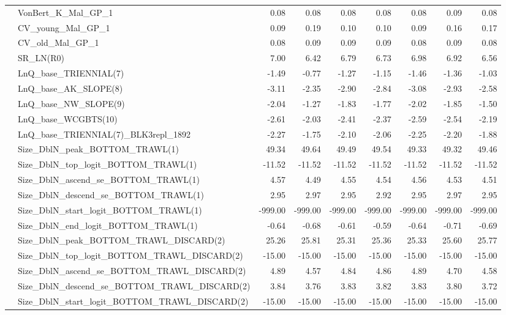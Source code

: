 \documentclass[
]{scrartcl}
\begin{document}
\begin{landscape}
\begin{longtable}{llrrrrrrr}
 & VonBert\_K\_Mal\_GP\_1 & 0.08 & 0.08 & 0.08 & 0.08 & 0.08 & 0.09 & 0.08 \\ 
 & CV\_young\_Mal\_GP\_1 & 0.09 & 0.19 & 0.10 & 0.10 & 0.09 & 0.16 & 0.17 \\ 
 & CV\_old\_Mal\_GP\_1 & 0.08 & 0.09 & 0.09 & 0.09 & 0.08 & 0.09 & 0.08 \\ 
 & SR\_LN(R0) & 7.00 & 6.42 & 6.79 & 6.73 & 6.98 & 6.92 & 6.56 \\ 
 & LnQ\_base\_TRIENNIAL(7) & -1.49 & -0.77 & -1.27 & -1.15 & -1.46 & -1.36 & -1.03 \\ 
 & LnQ\_base\_AK\_SLOPE(8) & -3.11 & -2.35 & -2.90 & -2.84 & -3.08 & -2.93 & -2.58 \\ 
 & LnQ\_base\_NW\_SLOPE(9) & -2.04 & -1.27 & -1.83 & -1.77 & -2.02 & -1.85 & -1.50 \\ 
 & LnQ\_base\_WCGBTS(10) & -2.61 & -2.03 & -2.41 & -2.37 & -2.59 & -2.54 & -2.19 \\ 
 & LnQ\_base\_TRIENNIAL(7)\_BLK3repl\_1892 & -2.27 & -1.75 & -2.10 & -2.06 & -2.25 & -2.20 & -1.88 \\ 
 & Size\_DblN\_peak\_BOTTOM\_TRAWL(1) & 49.34 & 49.64 & 49.49 & 49.54 & 49.33 & 49.32 & 49.46 \\ 
 & Size\_DblN\_top\_logit\_BOTTOM\_TRAWL(1) & -11.52 & -11.52 & -11.52 & -11.52 & -11.52 & -11.52 & -11.52 \\ 
 & Size\_DblN\_ascend\_se\_BOTTOM\_TRAWL(1) & 4.57 & 4.49 & 4.55 & 4.54 & 4.56 & 4.53 & 4.51 \\ 
 & Size\_DblN\_descend\_se\_BOTTOM\_TRAWL(1) & 2.95 & 2.97 & 2.95 & 2.92 & 2.95 & 2.97 & 2.95 \\ 
 & Size\_DblN\_start\_logit\_BOTTOM\_TRAWL(1) & -999.00 & -999.00 & -999.00 & -999.00 & -999.00 & -999.00 & -999.00 \\ 
 & Size\_DblN\_end\_logit\_BOTTOM\_TRAWL(1) & -0.64 & -0.68 & -0.61 & -0.59 & -0.64 & -0.71 & -0.69 \\ 
 & Size\_DblN\_peak\_BOTTOM\_TRAWL\_DISCARD(2) & 25.26 & 25.81 & 25.31 & 25.36 & 25.33 & 25.60 & 25.77 \\ 
 & Size\_DblN\_top\_logit\_BOTTOM\_TRAWL\_DISCARD(2) & -15.00 & -15.00 & -15.00 & -15.00 & -15.00 & -15.00 & -15.00 \\ 
 & Size\_DblN\_ascend\_se\_BOTTOM\_TRAWL\_DISCARD(2) & 4.89 & 4.57 & 4.84 & 4.86 & 4.89 & 4.70 & 4.58 \\ 
 & Size\_DblN\_descend\_se\_BOTTOM\_TRAWL\_DISCARD(2) & 3.84 & 3.76 & 3.83 & 3.82 & 3.83 & 3.80 & 3.72 \\ 
 & Size\_DblN\_start\_logit\_BOTTOM\_TRAWL\_DISCARD(2) & -15.00 & -15.00 & -15.00 & -15.00 & -15.00 & -15.00 & -15.00 \\ 

\end{longtable}
\end{landscape}
\end{document}
